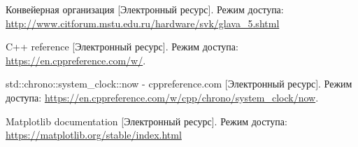 
\renewcommand\bibname{Список использованных источников}
\begin{thebibliography}{}
 Конвейерная организация [Электронный ресурс]. Режим доступа: \url{http://www.citforum.mstu.edu.ru/hardware/svk/glava_5.shtml}

 C++ reference [Электронный ресурс]. Режим доступа: \url{https://en.cppreference.com/w/}.

 std::chrono::system\_clock::now - cppreference.com [Электронный ресурс]. Режим доступа: \url{https://en.cppreference.com/w/cpp/chrono/system_clock/now}.

 Matplotlib documentation [Электронный ресурс]. Режим доступа: \url{https://matplotlib.org/stable/index.html}

\end{thebibliography}